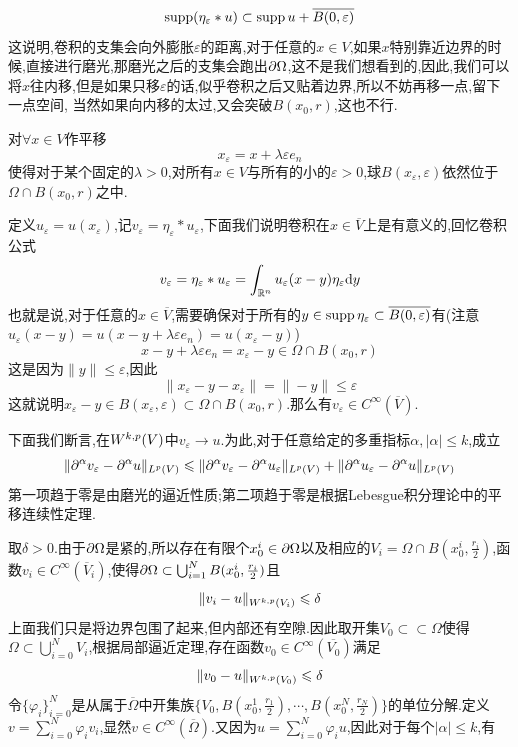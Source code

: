 $$
\operatorname{supp} (\eta_{\varepsilon}\ast u)\subset \operatorname{supp} u+\overline{B(0,\varepsilon)}
$$
这说明,卷积的支集会向外膨胀$\varepsilon$的距离,对于任意的$x\in V$,如果$x$特别靠近边界的时候,直接进行磨光,那磨光之后的支集会跑出$\partial\Omega$,这不是我们想看到的,因此,我们可以将$x$往内移,但是如果只移$\varepsilon$的话,似乎卷积之后又贴着边界,所以不妨再移一点,留下一点空间,
当然如果向内移的太过,又会突破$B(x_0,r)$,这也不行.\par
对$\forall x\in V$作平移
$$
x_{\varepsilon}=x+\lambda\varepsilon e_n
$$
使得对于某个固定的$\lambda>0$,对所有$x\in V$与所有的小的$\varepsilon>0$,球$B(x_{\varepsilon},\varepsilon)$依然位于$\Omega\cap B(x_0,r)$之中.\par
定义$u_{\varepsilon}=u(x_{\varepsilon})$,记$v_{\varepsilon}=\eta_{\varepsilon}\ast u_{\varepsilon}$,下面我们说明卷积在$x\in\overline{V}$上是有意义的,回忆卷积公式
$$
v_{\varepsilon}=\eta_{\varepsilon}\ast u_{\varepsilon}=\int_{\mathbb{R}^n}u_{\varepsilon}(x-y)\eta_{\varepsilon}\mathrm{d}y
$$
也就是说,对于任意的$x\in\overline{V}$,需要确保对于所有的$y\in\operatorname{supp}\eta_{\varepsilon}\subset \overline{B(0,\varepsilon)}$有(注意$u_{\varepsilon}(x-y)=u(x-y+\lambda\varepsilon e_n)=u(x_{\varepsilon}-y)$)
$$
x-y+\lambda\varepsilon e_n=x_{\varepsilon}-y\in\Omega\cap B(x_0,r)
$$
这是因为$\|y\|\leqslant\varepsilon$,因此
$$
\|x_{\varepsilon}-y-x_{\varepsilon}\|=\|-y\|\leqslant\varepsilon
$$
这就说明$x_{\varepsilon}-y\in B(x_{\varepsilon},\varepsilon)\subset\Omega\cap B(x_0,r)$.那么有$v_{\varepsilon}\in C^{\infty}(\overline{V})$.\par
下面我们断言,在$\Wkp[V]{k}{p}$中$v_{\varepsilon}\to u$.为此,对于任意给定的多重指标$\alpha,|\alpha|\leqslant k$,成立
$$
\|\partial ^{\alpha} v_{\varepsilon}-\partial ^{\alpha} u\|_{L^{p}(V)}\leqslant \|\partial ^{\alpha} v_{\varepsilon}-\partial ^{\alpha} u_{\varepsilon}\|_{L^{p}(V)}+\|\partial ^{\alpha} u_{\varepsilon}-\partial ^{\alpha} u\|_{L^{p}(V)}
$$
第一项趋于零是由磨光的逼近性质;第二项趋于零是根据Lebesgue积分理论中的平移连续性定理.\par
取$\delta>0$.由于$\partial\Omega$是紧的,所以存在有限个$x_0^i\in\partial\Omega$以及相应的$V_i=\Omega\cap B(x_0^i,\frac{r_i}{2})$,函数$v_i\in C^{\infty}(\overline{V}_i)$,使得$\partial\Omega\subset\bigcup_{i=1}^{N}B(x_0^i,\frac{r_i}{2})$且
$$
\|v_i-u\|_{\Wkp[V_i]{k}{p}}\leqslant\delta
$$
上面我们只是将边界包围了起来,但内部还有空隙.因此取开集$V_0\subset\subset\Omega$使得$\Omega\subset\bigcup_{i=0}^{N}V_i$,根据局部逼近定理,存在函数$v_0\in C^{\infty}(\overline{V_0})$满足
$$
\|v_0-u\|_{\Wkp[V_0]{k}{p}}\leqslant\delta
$$
令$\{\varphi_i\}_{i=0}^N$是从属于$\overline{\Omega}$中开集族$\{V_0,B(x_0^1,\frac{r_1}{2}),\cdots,B(x_0^N,\frac{r_N}{2})\}$的单位分解.定义$v=\sum_{i=0}^N\varphi_iv_i$,显然$v\in C^{\infty}(\overline{\Omega})$.又因为$u=\sum_{i=0}^N\varphi_iu$,因此对于每个$|\alpha|\leqslant k$,有

